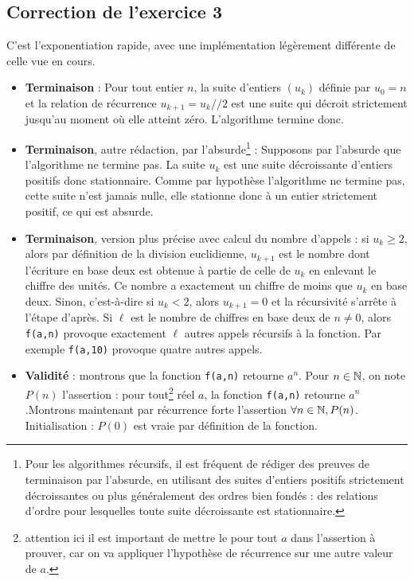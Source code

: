 \documentclass[11pt,a4paper]{article}
\begin{document}
\subsection*{Correction de l'exercice 3}

C'est l'exponentiation rapide, avec une implémentation légèrement différente de celle vue en cours.
\begin{itemize}
\item \textbf{Terminaison} : Pour tout entier $n$, la suite d'entiers $(u_k)$ définie par $u_0=n$ et la relation de récurrence $u_{k+1} = u_k // 2$ est une suite qui décroit strictement jusqu'au moment où elle atteint zéro. L'algorithme termine donc.
\item \textbf{Terminaison}, autre rédaction, par l'absurde\footnote{Pour les algorithmes récursifs, il est fréquent de rédiger des preuves de terminaison par l'absurde, en utilisant des suites d'entiers positifs strictement décroissantes ou plus généralement des ordres bien fondés : des relations d'ordre pour lesquelles toute suite décroissante est stationnaire.} : Supposons par l'absurde que l'algorithme ne termine pas. La suite $u_k$ est une suite décroissante d'entiers positifs donc stationnaire. Comme par hypothèse l'algorithme ne termine pas, cette suite n'est jamais nulle, elle stationne donc à un entier strictement positif, ce qui est absurde.
\item \textbf{Terminaison}, version plus précise avec calcul du nombre d'appels : si $u_k\geq 2$, alors par définition de la division euclidienne, $u_{k+1}$ est le nombre dont l'écriture en base deux est obtenue à partie de celle de $u_k$ en enlevant le chiffre des unités. Ce nombre a exactement un chiffre de moins que $u_k$ en base deux. Sinon, c'est-à-dire si $u_k<2$, alors $u_{k+1}=0$ et la récursivité s'arrête à l'étape d'après. Si $\ell$ est le nombre de chiffres en base deux de $n\neq 0$, alors \verb+f(a,n)+ provoque exactement $\ell$ autres appels récursifs à la fonction. Par exemple \verb+f(a,10)+ provoque quatre autres appels.
\item \textbf{Validité} : montrons que la fonction \verb+f(a,n)+ retourne $a^n$. Pour $n\in\mathbb{N}$, on note $P(n)$ l'assertion : \og pour tout\footnote{attention ici il est important de mettre le pour tout $a$ dans l'assertion à prouver, car on va appliquer l'hypothèse de récurrence sur une autre valeur de $a$.} réel $a$, la fonction \verb+f(a,n)+ retourne $a^n$.\fg Montrons maintenant par récurrence forte l'assertion $\forall n\in\mathbb{N}, P(n)$.\\
Initialisation : $P(0)$ est vraie par définition de la fonction.\\

\end{itemize}
\end{document}
